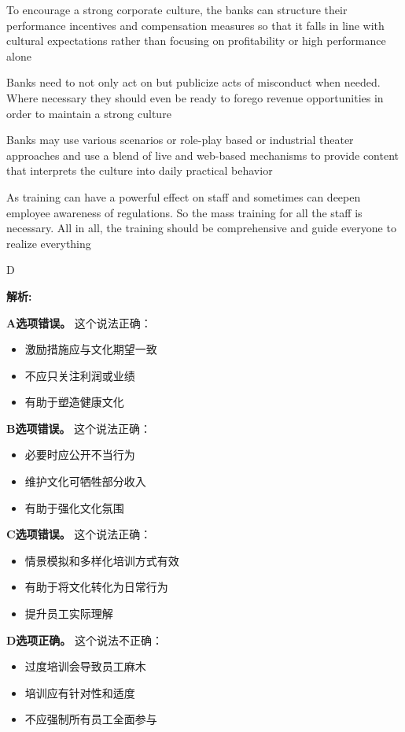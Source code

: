 \documentclass{article}
\newenvironment{explanation}
{\textbf{解析:}\par}
{\par}
\begin{document}
\begin{choices}
    \item To encourage a strong corporate culture, the banks can structure their performance incentives and compensation measures so that it falls in line with cultural expectations rather than focusing on profitability or high performance alone
    \item Banks need to not only act on but publicize acts of misconduct when needed. Where necessary they should even be ready to forego revenue opportunities in order to maintain a strong culture
    \item Banks may use various scenarios or role-play based or industrial theater approaches and use a blend of live and web-based mechanisms to provide content that interprets the culture into daily practical behavior
    \item As training can have a powerful effect on staff and sometimes can deepen employee awareness of regulations. So the mass training for all the staff is necessary. All in all, the training should be comprehensive and guide everyone to realize everything
\end{choices}

\begin{correctanswer}
    D
\end{correctanswer}

\begin{explanation}
    \textbf{A选项错误。}
    这个说法正确：
    \begin{itemize}
        \item 激励措施应与文化期望一致
        \item 不应只关注利润或业绩
        \item 有助于塑造健康文化
    \end{itemize}

    \textbf{B选项错误。}
    这个说法正确：
    \begin{itemize}
        \item 必要时应公开不当行为
        \item 维护文化可牺牲部分收入
        \item 有助于强化文化氛围
    \end{itemize}

    \textbf{C选项错误。}
    这个说法正确：
    \begin{itemize}
        \item 情景模拟和多样化培训方式有效
        \item 有助于将文化转化为日常行为
        \item 提升员工实际理解
    \end{itemize}

    \textbf{D选项正确。}
    这个说法不正确：
    \begin{itemize}
        \item 过度培训会导致员工麻木
        \item 培训应有针对性和适度
        \item 不应强制所有员工全面参与
    \end{itemize}
\end{explanation}
\end{document}
